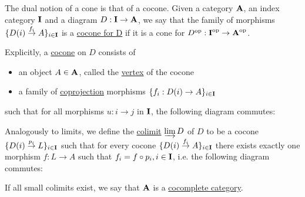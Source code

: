 \begin{definition}\label{def:categorical_cocone}\cite[definition 5.2.1]{Leinster2014}
  The dual notion of a cone is that of a cocone. Given a category $\operatorname{\mathbf{A}}$, an index category $\operatorname{\mathbf{I}}$ and a diagram $D: \operatorname{\mathbf{I}} \to \operatorname{\mathbf{A}}$, we say that the family of morphisms $\{ D(i) \overset {f_i} \to A \}_{i \in \operatorname{\mathbf{I}}}$ is a \ul{cocone for D} if it is a cone for $D^{\operatorname{op}}: \operatorname{\mathbf{I}}^{\operatorname{op}} \to \operatorname{\mathbf{A}}^{\operatorname{op}}$.

  Explicitly, a \ul{cocone} on $D$ consists of
  \begin{itemize}
    \item an object $A \in \operatorname{\mathbf{A}}$, called the \ul{vertex} of the cocone
    \item a family of \ul{coprojection} morphisms $\{ f_i: D(i) \to A \}_{i \in \operatorname{\mathbf{I}}}$
  \end{itemize}
  such that for all morphisms $u: i \to j$ in $\operatorname{\mathbf{I}}$, the following diagram commutes:
  \begin{Center}
  \end{Center}
\end{definition}

\begin{definition}\label{def:categorical_colimit}\cite[definition 5.1.19(b)]{Leinster2014}
  Analogously to limits, we define the \ul{colimit} $\varinjlim D$ of $D$ to be a cocone $\{ D(i) \overset {p_i} \to L \}_{i \in \operatorname{\mathbf{I}}}$ such that for every cocone $\{ D(i) \overset {f_i} \to A \}_{i \in \operatorname{\mathbf{I}}}$ there exists exactly one morphism $f: L \to A$ such that $f_i = f \circ p_i, i \in \operatorname{\mathbf{I}}$, i.e. the following diagram commutes:
  \begin{Center}
  \end{Center}

  If all small colimits exist, we say that $\operatorname{\mathbf{A}}$ is a \ul{cocomplete category}.
\end{definition}

